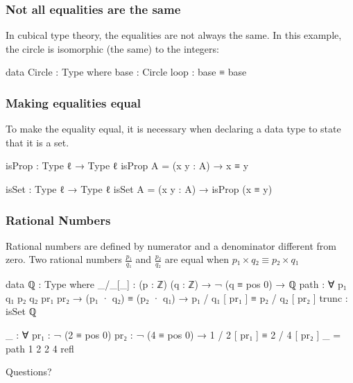 \documentclass{beamer}
\begin{document}
\begin{frame}
  \frametitle{Not all equalities are the same}
  In cubical type theory, the equalities are not always the same.
  In this example, the circle is isomorphic (the same) to the integers:
  \begin{code}
  data Circle : Type where
    base : Circle
    loop : base ≡ base
  \end{code}
\end{frame}

\begin{frame}
  \frametitle{Making equalities equal}
  To make the equality equal, it is necessary when declaring a data type to state that it is a set.
  \begin{code}
  isProp : Type ℓ → Type ℓ
  isProp A = (x y : A) → x ≡ y

  isSet : Type ℓ → Type ℓ
  isSet A = (x y : A) → isProp (x ≡ y)
  \end{code}
\end{frame}

\begin{frame}
  \frametitle{Rational Numbers}
  Rational numbers are defined by numerator and a denominator different from zero.
  Two rational numbers $ \frac{p₁}{q₁} $ and $ \frac{p₂}{q₂} $ are equal when $ p₁ \times q₂ \equiv p₂ \times q₁ $
  \begin{code}
  data ℚ : Type where
    _/_[_] : (p : ℤ) (q : ℤ) → ¬ (q ≡ pos 0) → ℚ
    path : ∀ p₁ q₁ p₂ q₂ {pr₁ pr₂} → (p₁ · q₂) ≡ (p₂ · q₁)
      → p₁ / q₁ [ pr₁ ] ≡ p₂ / q₂ [ pr₂ ]
    trunc : isSet ℚ

  _ : ∀ {pr₁ : ¬ (2 ≡ pos 0)} {pr₂ : ¬ (4 ≡ pos 0)}
    → 1 / 2 [ pr₁ ] ≡ 2 / 4 [ pr₂ ]
  _ = path 1 2 2 4 refl
  \end{code}
\end{frame}

\begin{frame}
  \vspace*{36 pt}
  \begin{center}
  {\Huge Questions?}
  \end{center}
\end{frame}
\end{document}
